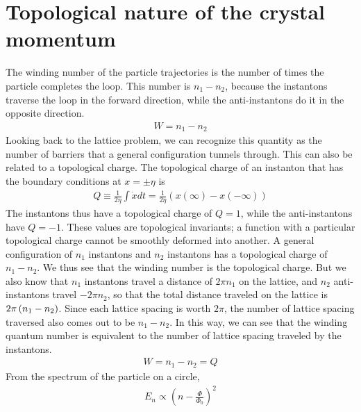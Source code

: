\documentclass[12pt,onecolumn]{revtex4-2}
\begin{document}
\section{Topological nature of the crystal momentum}
The winding number of the particle trajectories is the number of times the particle completes the loop. This number is \(n_1 - n_2\), because the instantons traverse the loop in the forward direction, while the anti-instantons do it in the opposite direction.
\begin{equation}\begin{aligned}
	W = n_1 - n_2
\end{aligned}\end{equation}
Looking back to the lattice problem, we can recognize this quantity as the number of barriers that a general configuration tunnels through. This can also be related to a topological charge. The topological charge of an instanton that has the boundary conditions at \(x = \pm \eta\) is
\begin{equation}\begin{aligned}
	Q \equiv \frac{1}{2\eta}\int \dot x dt = \frac{1}{2\eta}\left(x(\infty) - x(-\infty)\right)
\end{aligned}\end{equation}
The instantons thus have a topological charge of \(Q = 1\), while the anti-instantons have \(Q = -1\). These values are topological invariants; a function with a particular topological charge cannot be smoothly deformed into another. A general configuration of \(n_1\) instantons and \(n_2\) instantons has a topological charge of \(n_1 - n_2\). We thus see that the winding number is the topological charge.
But we also know that \(n_1\) instantons travel a distance of \(2\pi n_1\) on the lattice, and \(n_2\) anti-instantons travel \(-2\pi n_2\), so that the total distance traveled on the lattice is \(2\pi\left({n_1 - n_2}\right)\). Since each lattice spacing is worth \(2\pi\), the number of lattice spacing traversed also comes out to be \(n_1 - n_2\). In this way, we can see that the winding quantum number is equivalent to the number of lattice spacing traveled by the instantons.
\begin{equation}\begin{aligned}
	W = n_1 - n_2 = Q
\end{aligned}\end{equation}
From the spectrum of the particle on a circle,
\begin{equation}\begin{aligned}
	E_n \propto (n - \frac{\Phi}{\Phi_0})^2
\end{aligned}\end{equation}
\end{document}
